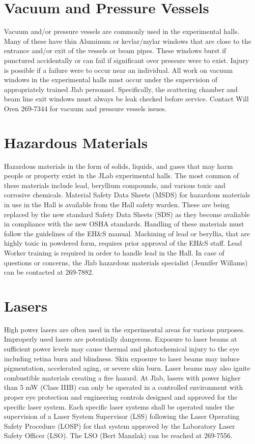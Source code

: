 \section{Vacuum and Pressure Vessels}

	Vacuum and/or pressure vessels are commonly used in the experimental halls. Many 
of these have thin Aluminum or kevlar/mylar windows that are close to the entrance 
and/or exit of the vessels or beam pipes. These windows burst if punctured accidentally 
or can fail if significant over pressure were to exist. Injury is possible if a failure 
were to occur near an individual. All work on vacuum windows in the experimental halls 
must occur under the supervision of appropriately trained Jlab personnel. Specifically, 
the scattering chamber and beam line exit windows must always be leak checked before service. 
Contact Will Oren 269-7344 for vacuum and pressure vessels issues.

\section{Hazardous Materials}

	Hazardous materials in the form of solids, liquids, and gases that may harm people 
or property exist in the JLab experimental halls. The most common of these materials include 
lead, beryllium compounds, and various toxic and corrosive chemicals. 
Material Safety Data Sheets (MSDS) for hazardous materials 
in use in the Hall is available from the Hall safety warden.  These are being replaced by the new standard
Safety Data Sheets (SDS) as they become avaliable in compliance with the new OSHA standards.    Handling of these materials 
must follow the guidelines of the EH\&S manual. Machining of lead or beryllia, that 
are highly toxic in powdered form, requires prior approval of the EH\&S staff. 
Lead Worker training is required in order to handle lead in the Hall. 
In case of questions or concerns, the Jlab hazardous materials specialist (Jennifer Willams) can be contacted at 269-7882.

\section{Lasers}

	High power lasers are often used in the experimental areas for various purposes. Improperly 
used lasers are potentially dangerous. Exposure to laser beams at sufficient power levels 
may cause thermal and photochemical injury to the eye including retina burn and blindness. 
Skin exposure to laser beams may induce pigmentation, accelerated aging, or severe skin burn. 
Laser beams may also ignite combustible materials creating a fire hazard. At Jlab, lasers with power 
higher than 5 mW (Class IIIB) can only be operated in a controlled environment with proper eye protection 
and engineering controls designed and approved for the specific laser system. Each specific laser systems 
shall be operated under the supervision of a Laser System Supervisor (LSS) following the Laser 
Operating Safety Procedure (LOSP) for that system approved by the Laboratory Laser Safety Officer (LSO). 
The LSO (Bert Manzlak) can be reached at 269-7556.

